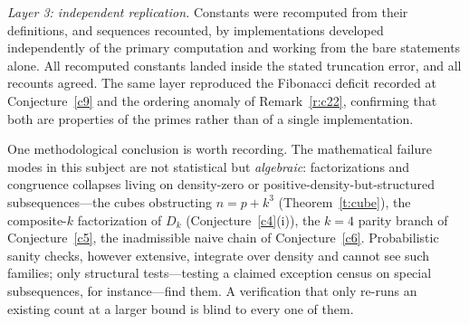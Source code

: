 \documentclass[11pt]{article}
\theoremstyle{definition}
\begin{document}
\emph{Layer 3: independent replication.}  Constants were recomputed
from their definitions, and sequences recounted, by implementations
developed independently of the primary computation and working from
the bare
statements alone.  All recomputed constants landed inside the stated
truncation error, and all recounts agreed.  The same layer reproduced
the Fibonacci deficit recorded at Conjecture~\ref{c9} and the ordering
anomaly of Remark~\ref{r:c22}, confirming that both are properties of
the primes rather than of a single implementation.

One methodological conclusion is worth recording.  The mathematical
failure modes in this subject are not statistical but \emph{algebraic}:
factorizations and congruence collapses living on density-zero or
positive-density-but-structured subsequences---the cubes obstructing
$n=p+k^3$ (Theorem~\ref{t:cube}), the composite-$k$ factorization of
$D_k$ (Conjecture~\ref{c4}(i)), the $k=4$ parity branch of
Conjecture~\ref{c5}, the inadmissible naive chain of
Conjecture~\ref{c6}.  Probabilistic sanity checks, however extensive,
integrate over density and cannot see such families; only structural
tests---testing a claimed exception census on special subsequences, for
instance---find them.  A verification that only re-runs an existing
count at a larger bound is blind to every one of them.
\end{document}
